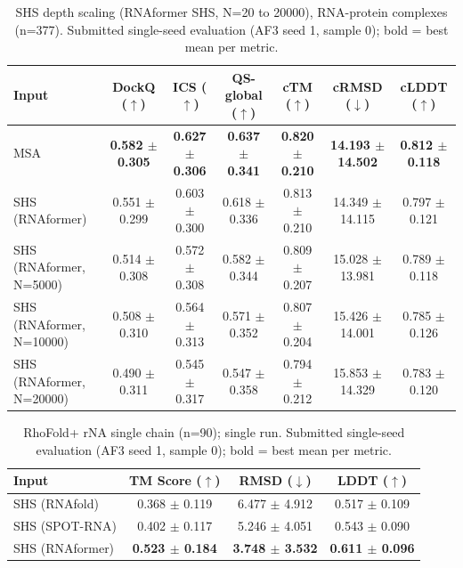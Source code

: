 \begin{table}[htbp]
\centering
\caption{SHS depth scaling (RNAformer SHS, N=20 to 20000), RNA-protein complexes (n=377). Submitted single-seed evaluation (AF3 seed 1, sample 0); bold = best mean per metric.}
\label{tab:rna_protein_complexes_scaling}
\begin{tabular}{lcccccc}
\toprule
Input & DockQ ($\uparrow$) & ICS ($\uparrow$) & QS-global ($\uparrow$) & cTM ($\uparrow$) & cRMSD ($\downarrow$) & cLDDT ($\uparrow$) \\
\midrule
MSA & \textbf{0.582 $\pm$ 0.305} & \textbf{0.627 $\pm$ 0.306} & \textbf{0.637 $\pm$ 0.341} & \textbf{0.820 $\pm$ 0.210} & \textbf{14.193 $\pm$ 14.502} & \textbf{0.812 $\pm$ 0.118} \\
SHS (RNAformer) & 0.551 $\pm$ 0.299 & 0.603 $\pm$ 0.300 & 0.618 $\pm$ 0.336 & 0.813 $\pm$ 0.210 & 14.349 $\pm$ 14.115 & 0.797 $\pm$ 0.121 \\
SHS (RNAformer, N=5000) & 0.514 $\pm$ 0.308 & 0.572 $\pm$ 0.308 & 0.582 $\pm$ 0.344 & 0.809 $\pm$ 0.207 & 15.028 $\pm$ 13.981 & 0.789 $\pm$ 0.118 \\
SHS (RNAformer, N=10000) & 0.508 $\pm$ 0.310 & 0.564 $\pm$ 0.313 & 0.571 $\pm$ 0.352 & 0.807 $\pm$ 0.204 & 15.426 $\pm$ 14.001 & 0.785 $\pm$ 0.126 \\
SHS (RNAformer, N=20000) & 0.490 $\pm$ 0.311 & 0.545 $\pm$ 0.317 & 0.547 $\pm$ 0.358 & 0.794 $\pm$ 0.212 & 15.853 $\pm$ 14.329 & 0.783 $\pm$ 0.120 \\
\bottomrule
\end{tabular}
\end{table}

\begin{table}[htbp]
\centering
\caption{RhoFold+ rNA single chain (n=90); single run. Submitted single-seed evaluation (AF3 seed 1, sample 0); bold = best mean per metric.}
\label{tab:rf_rna_single_chain}
\begin{tabular}{lccc}
\toprule
Input & TM Score ($\uparrow$) & RMSD ($\downarrow$) & LDDT ($\uparrow$) \\
\midrule
SHS (RNAfold) & 0.368 $\pm$ 0.119 & 6.477 $\pm$ 4.912 & 0.517 $\pm$ 0.109 \\
SHS (SPOT-RNA) & 0.402 $\pm$ 0.117 & 5.246 $\pm$ 4.051 & 0.543 $\pm$ 0.090 \\
SHS (RNAformer) & \textbf{0.523 $\pm$ 0.184} & \textbf{3.748 $\pm$ 3.532} & \textbf{0.611 $\pm$ 0.096} \\
\bottomrule
\end{tabular}
\end{table}

